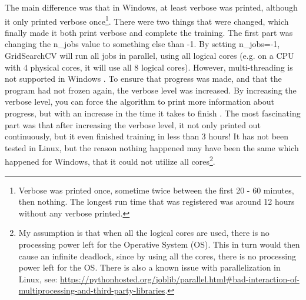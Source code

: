 The main difference was that in Windows, at least verbose was printed, although it only printed verbose once\footnote{
	Verbose was printed once, sometime twice between the first 20 - 60 minutes, then nothing.
	The longest run time that was registered was around 12 hours without any verbose printed.
}.
There were two things that were changed, which finally made it both print verbose and complete the training.
The first part was changing the n\_jobs value to something else than -1. 
By setting n\_jobs=-1, GridSearchCV will run all jobs in parallel, using all logical cores (e.g. on a CPU with 4 physical cores, it will use all 8 logical cores). 
However, multi-threading is not supported in Windows \cite{GS2015}. 
To ensure that progress was made, and that the program had not frozen again, the verbose level was increased.
By increasing the verbose level, you can force the algorithm to print more information about progress, but with an increase in the time it takes to finish \cite{Manuel2015, user29912432014}. 
The most fascinating part was that after increasing the verbose level, it not only printed out continuously, but it even finished training in less than 3 hours!
It has not been tested in Linux, but the reason nothing happened may have been the same which happened for Windows, that it could not utilize all cores\footnote{
	My assumption is that when all the logical cores are used, there is no processing power left for the Operative System (OS). 
	This in turn would then cause an infinite deadlock, since by using all the cores, there is no processing power left for the OS.
	There is also a known issue with parallelization in Linux, see: 
	\url{https://pythonhosted.org/joblib/parallel.html\#bad-interaction-of-multiprocessing-and-third-party-libraries}.
}.























